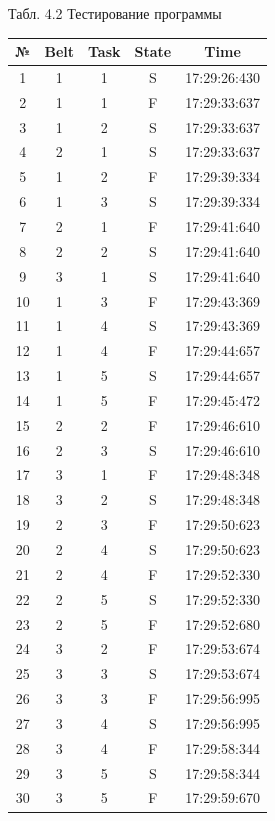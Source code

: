 \documentclass[12pt]{report}
\begin{document}
\begin{center}
	Табл. 4.2 Тестирование программы\\
	\begin{tabular}{|c c c c c|}			
		\hline
		№ & Belt & Task & State & Time \\ [0.5ex] 
		\hline
		1 & 1 & 1 & S & 17:29:26:430 \\
		\hline
		2 & 1 & 1 & F & 17:29:33:637 \\
		\hline
		3 & 1 & 2 & S & 17:29:33:637 \\
		\hline
		4 & 2 & 1 & S & 17:29:33:637 \\
		\hline
		5 & 1 & 2 & F & 17:29:39:334 \\
		\hline
		6 & 1 & 3 & S & 17:29:39:334 \\
		\hline
		7 & 2 & 1 & F & 17:29:41:640 \\
		\hline	
		8 & 2 & 2 & S & 17:29:41:640 \\
		\hline	
		9 & 3 & 1 & S & 17:29:41:640 \\
		\hline	
		10 & 1 & 3 & F & 17:29:43:369 \\
		\hline	
		11 & 1 & 4 & S & 17:29:43:369 \\
		\hline	
		12 & 1 & 4 & F & 17:29:44:657 \\
		\hline	
		13 & 1 & 5 & S & 17:29:44:657 \\
		\hline	
		14 & 1 & 5 & F & 17:29:45:472 \\
		\hline	
		15 & 2 & 2 & F & 17:29:46:610 \\
		\hline	
		16 & 2 & 3 & S & 17:29:46:610 \\
		\hline	
		17 & 3 & 1 & F & 17:29:48:348 \\
		\hline	
		18 & 3 & 2 & S & 17:29:48:348 \\
		\hline	
		19 & 2 & 3 & F & 17:29:50:623 \\
		\hline	
		20 & 2 & 4 & S & 17:29:50:623 \\
		\hline
		21 & 2 & 4 & F & 17:29:52:330 \\
		\hline	
		22 & 2 & 5 & S & 17:29:52:330 \\
		\hline	
		23 & 2 & 5 & F & 17:29:52:680 \\
		\hline	
		24 & 3 & 2 & F & 17:29:53:674 \\
		\hline	
		25 & 3 & 3 & S & 17:29:53:674 \\
		\hline
		26 & 3 & 3 & F & 17:29:56:995 \\
		\hline	
		27 & 3 & 4 & S & 17:29:56:995 \\
		\hline	
		28 & 3 & 4 & F & 17:29:58:344 \\
		\hline	
		29 & 3 & 5 & S & 17:29:58:344 \\
		\hline	
		30 & 3 & 5 & F & 17:29:59:670 \\
		\hline				
	\end{tabular}
\end{center}
\end{document}
